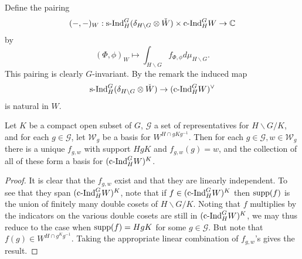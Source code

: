 \documentclass{memoir}
\begin{document}
\begin{definition}
    Define the pairing
    \begin{equation} 
        (-,-)_W:\text{s-Ind}_H^G(\delta_{H\backslash G}\otimes \check W)\times \text{c-Ind}_H^GW\to \mathbb{C}
    \end{equation}
    by
    \begin{equation}
        (\Phi,\phi)_W \mapsto \int_{H\backslash G} f_{\Phi,\phi}d\mu_{H\backslash G}.
    \end{equation}
    This pairing is clearly $G$-invariant.
    By the remark the induced map 
    \begin{equation}
        \text{s-Ind}_H^G(\delta_{H\backslash G}\otimes \check W)\to (\text{c-Ind}_H^GW)^\vee
    \end{equation}
    is natural in $W$.
\end{definition}
\begin{lemma}
    Let $K$ be a compact open subset of $G$, $\mathcal G$ a set of representatives for $H\backslash G/K$, and for each $g\in \mathcal G$, let $\mathcal W_g$ be a basis for $W^{H\cap gKg^{-1}}$.
    Then for each $g\in \mathcal G, w\in \mathcal W_g$ there is a unique $f_{g,w}$ with support $HgK$ and $f_{g,w}(g) = w$, and the collection of all of these form a basis for $(\text{c-Ind}_H^GW)^K$.
\end{lemma}
\begin{proof}
    It is clear that the $f_{g,w}$ exist and that they are linearly independent.
    To see that they span $(\text{c-Ind}_H^GW)^K$, note that if $f\in (\text{c-Ind}_H^GW)^K$ then $\text{supp}(f)$ is the union of finitely many double cosets of $H\backslash G/K$.
    Noting that $f$ multiplies by the indicators on the various double cosets are still in $(\text{c-Ind}_H^GW)^K$, we may thus reduce to the case when $\text{supp}(f) = HgK$ for some $g\in \mathcal G$.
    But note that $f(g) \in W^{H\cap g^Kg^{-1}}$.
    Taking the appropriate linear combination of $f_{g,w}$'s gives the result.
\end{proof}
\end{document}
